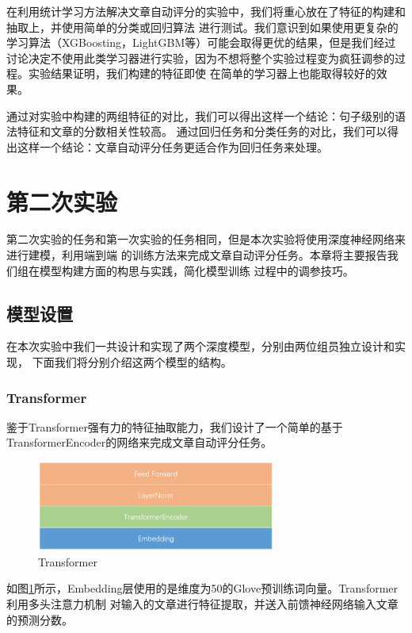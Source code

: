 \documentclass[UTF8]{article}
\begin{document}
在利用统计学习方法解决文章自动评分的实验中，我们将重心放在了特征的构建和抽取上，并使用简单的分类或回归算法
进行测试。我们意识到如果使用更复杂的学习算法（XGBoosting，LightGBM等）可能会取得更优的结果，但是我们经过
讨论决定不使用此类学习器进行实验，因为不想将整个实验过程变为疯狂调参的过程。实验结果证明，我们构建的特征即使
在简单的学习器上也能取得较好的效果。

通过对实验中构建的两组特征的对比，我们可以得出这样一个结论：句子级别的语法特征和文章的分数相关性较高。
通过回归任务和分类任务的对比，我们可以得出这样一个结论：文章自动评分任务更适合作为回归任务来处理。

\section{第二次实验}
第二次实验的任务和第一次实验的任务相同，但是本次实验将使用深度神经网络来进行建模，利用端到端
的训练方法来完成文章自动评分任务。本章将主要报告我们组在模型构建方面的构思与实践，简化模型训练
过程中的调参技巧。

\subsection{模型设置}
在本次实验中我们一共设计和实现了两个深度模型，分别由两位组员独立设计和实现，
下面我们将分别介绍这两个模型的结构。

\subsubsection{Transformer}
鉴于Transformer强有力的特征抽取能力，我们设计了一个简单的基于TransformerEncoder的网络来完成文章自动评分任务。

\begin{figure}[h]
    \centering
    \includegraphics[width=0.7\textwidth]{fig/5.png}
    \caption{Transformer}
    \label{fig:Transformer}
\end{figure}

如图\ref{fig:Transformer}所示，Embedding层使用的是维度为50的Glove预训练词向量。Transformer利用多头注意力机制
对输入的文章进行特征提取，并送入前馈神经网络输入文章的预测分数。
\end{document}
